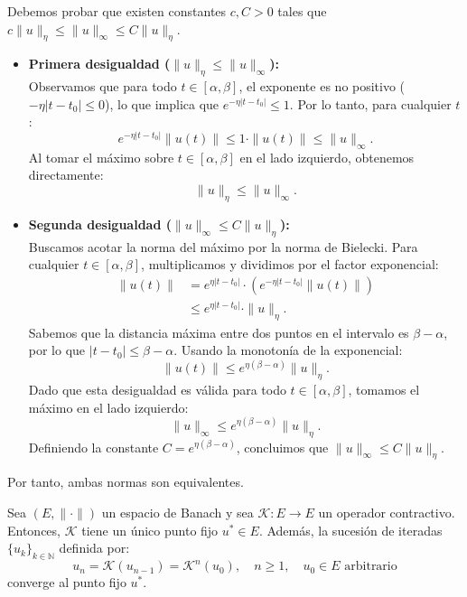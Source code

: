 Debemos probar que existen constantes $c, C > 0$ tales que $c \| u \|_{\eta} \leq \| u \|_{\infty} \leq C \| u \|_{\eta}$.

\begin{itemize}
    \item \textbf{Primera desigualdad ($\| u \|_{\eta} \leq \| u \|_{\infty}$):} \\
    Observamos que para todo $t \in [\alpha, \beta]$, el exponente es no positivo ($-\eta |t-t_0| \leq 0$), lo que implica que $e^{-\eta |t-t_0|} \leq 1$. Por lo tanto, para cualquier $t$:
    \[
        e^{-\eta | t - t_0 |} \| u(t) \| \leq 1 \cdot \| u(t) \| \leq \| u \|_{\infty}.
    \]
    Al tomar el máximo sobre $t \in [\alpha, \beta]$ en el lado izquierdo, obtenemos directamente:
    \[
        \| u \|_{\eta} \leq \| u \|_{\infty}.
    \]
    \item \textbf{Segunda desigualdad ($\| u \|_{\infty} \leq C \| u \|_{\eta}$):} \\
    Buscamos acotar la norma del máximo por la norma de Bielecki. Para cualquier $t \in [\alpha, \beta]$, multiplicamos y dividimos por el factor exponencial:
    \begin{align*}
        \| u(t) \| &= e^{\eta | t - t_0 |} \cdot \left( e^{-\eta | t - t_0 |} \| u(t) \| \right) \\
                &\leq e^{\eta | t - t_0 |} \cdot \| u \|_{\eta}.
    \end{align*}
    Sabemos que la distancia máxima entre dos puntos en el intervalo es $\beta - \alpha$, por lo que $|t - t_0| \leq \beta - \alpha$. Usando la monotonía de la exponencial:
    \[
        \| u(t) \| \leq e^{\eta (\beta - \alpha)} \| u \|_{\eta}.
    \]
    Dado que esta desigualdad es válida para todo $t \in [\alpha, \beta]$, tomamos el máximo en el lado izquierdo:
    \[
        \| u \|_{\infty} \leq e^{\eta (\beta - \alpha)} \| u \|_{\eta}.
    \]
    Definiendo la constante $C = e^{\eta (\beta - \alpha)}$, concluimos que $\| u \|_{\infty} \leq C \| u \|_{\eta}$.
\end{itemize}

Por tanto, ambas normas son equivalentes.


\begin{teorema} 
    Sea $(E, \| \cdot \|)$ un espacio de Banach y sea $\mathcal{K} : E \to E$ un operador contractivo. Entonces, $\mathcal{K}$ tiene un único punto fijo $u^{*} \in E$. Además, la sucesión de iteradas $\{ u_k \}_{k \in \mathbb{N}}$ definida por:
    \[
        u_{n} = \mathcal{K}(u_{n-1}) = \mathcal{K}^{n}(u_0), \quad n \geq 1, \quad u_0 \in E \text{ arbitrario}
    \]
    converge al punto fijo $u^{*}$.  
\end{teorema}

